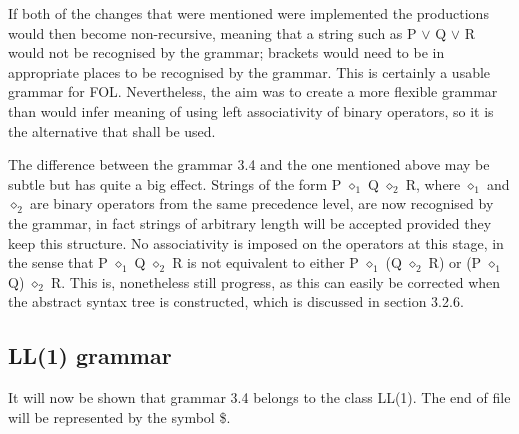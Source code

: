 If both of the changes that were mentioned were implemented the productions would then become non-recursive, meaning that a string such as P $\lor$ Q $\lor$ R would not be recognised by the grammar; brackets would need to be in appropriate places to be recognised by the grammar. This is certainly a usable grammar for FOL. Nevertheless, the aim was to create a more flexible grammar than would infer meaning of using left associativity of binary operators, so it is the alternative that shall be used.

The difference between the grammar 3.4 and the one mentioned above may be subtle but has quite a big effect. Strings of the form P $\diamond_1$ Q $\diamond_2$ R, where $\diamond_1$ and $\diamond_2$ are binary operators from the same precedence level, are now recognised by the grammar, in fact strings of arbitrary length will be accepted provided they keep this structure. No associativity is imposed on the operators at this stage, in the sense that P $\diamond_1$ Q $\diamond_2$ R is not equivalent to either P $\diamond_1$ (Q $\diamond_2$ R) or (P $\diamond_1$ Q) $\diamond_2$ R. This is, nonetheless still progress, as this can easily be corrected when the abstract syntax tree is constructed, which is discussed in section 3.2.6.

\subsection{LL(1) grammar}

It will now be shown that grammar 3.4  belongs to the class LL(1). The end of file will be represented by the symbol \$.

